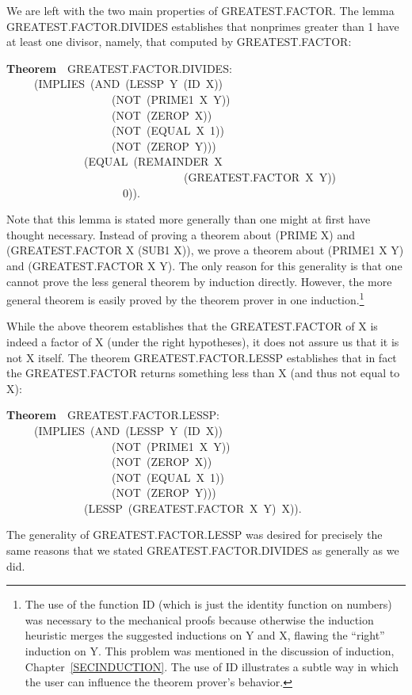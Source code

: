 \documentclass[10pt]{book}
\newenvironment{pubasis}{\begin{flushleft}}{\end{flushleft}}
\newcommand{\axiomordefinition}[1]{\vspace{6pt}\Large\textsf{\textbf{#1}}\normalsize}
\begin{document}
We are left with the two main properties of GREATEST.FACTOR.
The lemma GREATEST.FACTOR.DIVIDES establishes that nonprimes greater than 1 have at least
one divisor, namely, that computed by GREATEST.FACTOR:
\begin{pubasis}
\axiomordefinition{Theorem}~~GREATEST.FACTOR.DIVIDES:\\
~~~~~(IMPLIES~(AND~(LESSP~Y~(ID~X))\\
~~~~~~~~~~~~~~~~~~~(NOT~(PRIME1~X~Y))\\
~~~~~~~~~~~~~~~~~~~(NOT~(ZEROP~X))\\
~~~~~~~~~~~~~~~~~~~(NOT~(EQUAL~X~1))\\
~~~~~~~~~~~~~~~~~~~(NOT~(ZEROP~Y)))\\
~~~~~~~~~~~~~~(EQUAL~(REMAINDER~X\\
~~~~~~~~~~~~~~~~~~~~~~~~~~~~~~~~(GREATEST.FACTOR~X~Y))\\
~~~~~~~~~~~~~~~~~~~~~0)).\\
\end{pubasis}
Note that this lemma is stated more generally than
one might at first have thought necessary.  Instead
of proving a theorem about (PRIME X) and (GREATEST.FACTOR X (SUB1 X)),
we prove a theorem about (PRIME1 X Y) and
(GREATEST.FACTOR X Y).  The only reason for this
generality is that one cannot prove the less
general theorem by induction directly.  However,
the more general theorem is easily proved by
the theorem prover in one induction.\footnote{The use of the function ID (which is just the identity function on numbers) was necessary to the mechanical proofs because otherwise the induction heuristic merges the suggested inductions on Y and X, flawing the ``right'' induction on Y.  This problem was mentioned in the discussion of induction, Chapter~\ref{SECINDUCTION}. The use of ID illustrates a subtle way in which the user can influence the theorem prover's behavior.}

While the above theorem establishes that the
GREATEST.FACTOR of X is indeed a factor of X (under the right hypotheses),
it does not assure us that it is not X itself.  The theorem
GREATEST.FACTOR.LESSP establishes that in fact the GREATEST.FACTOR
returns something less than X (and thus not equal to X):

\begin{pubasis}
\axiomordefinition{Theorem}~~GREATEST.FACTOR.LESSP:\\
~~~~~(IMPLIES~(AND~(LESSP~Y~(ID~X))\\
~~~~~~~~~~~~~~~~~~~(NOT~(PRIME1~X~Y))\\
~~~~~~~~~~~~~~~~~~~(NOT~(ZEROP~X))\\
~~~~~~~~~~~~~~~~~~~(NOT~(EQUAL~X~1))\\
~~~~~~~~~~~~~~~~~~~(NOT~(ZEROP~Y)))\\
~~~~~~~~~~~~~~(LESSP~(GREATEST.FACTOR~X~Y)~X)).\\
\end{pubasis}
The generality of GREATEST.FACTOR.LESSP was desired
for precisely the same reasons that we stated
GREATEST.FACTOR.DIVIDES as generally as we did.
\end{document}
